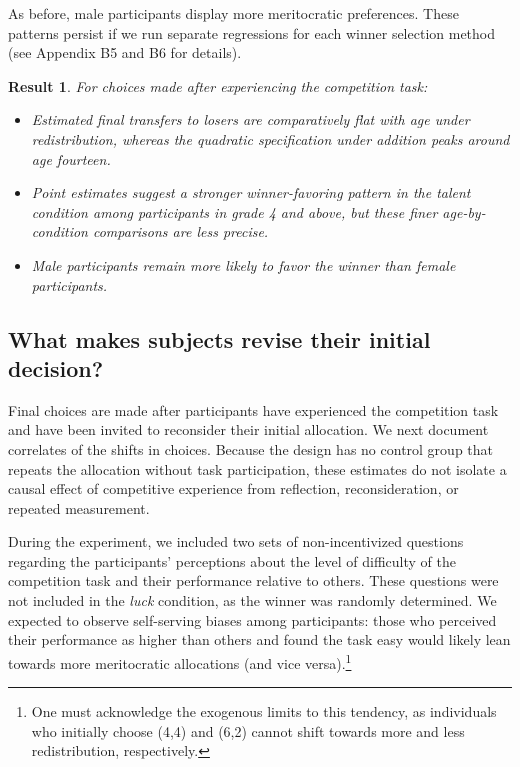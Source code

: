 \documentclass[11pt]{article}
\newtheorem{Result}{Result}
\begin{document}
As before, male participants display more meritocratic preferences. These patterns persist if we run separate regressions for each winner selection method (see Appendix B5 and B6 for details).


\begin{Result} \label{res-final}
For choices made after experiencing the competition task:
\noindent \begin{itemize}[noitemsep, topsep=0pt, parsep=0pt, partopsep=0pt]
\item[\textbf{a)}] Estimated final transfers to losers are comparatively flat with age under redistribution, whereas the quadratic specification under addition peaks around age fourteen.
\item[\textbf{b)}] Point estimates suggest a stronger winner-favoring pattern in the talent condition among participants in grade 4 and above, but these finer age-by-condition comparisons are less precise.
\item[\textbf{c)}] Male participants remain more likely to favor the winner than female participants.
\end{itemize}
\end{Result}
 

\subsection{What makes subjects revise their initial decision? \label{sec-revise}}

Final choices are made after participants have experienced the competition task and have been invited to reconsider their initial allocation. We next document correlates of the shifts in choices. Because the design has no control group that repeats the allocation without task participation, these estimates do not isolate a causal effect of competitive experience from reflection, reconsideration, or repeated measurement.

During the experiment, we included two sets of non-incentivized questions regarding the  participants’ perceptions about the level of difficulty of the competition task and their performance relative to others. These questions were not included in the \emph{luck} condition, as the winner was randomly determined. We expected to observe self-serving biases among participants: those who perceived their performance as higher than others and found the task easy would likely lean towards more meritocratic allocations (and vice versa).\footnote{One must acknowledge the exogenous limits to this tendency, as individuals who initially choose (4,4) and (6,2) cannot shift towards more and less redistribution, respectively.}
\end{document}
